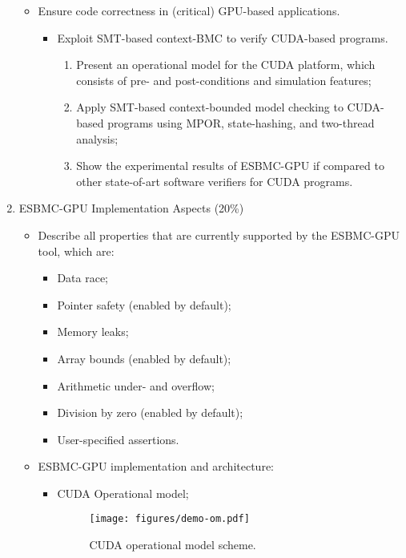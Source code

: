 \documentclass{llncs}
\begin{document}
\begin{enumerate}
\begin{itemize}
     \item Ensure code correctness in (critical) GPU-based applications.
         \begin{itemize}
		\item Exploit SMT-based context-BMC to verify CUDA-based programs.
			\begin{enumerate}
				\item Present an operational model for the CUDA platform, which consists of pre- and post-conditions and simulation features;
				\item Apply SMT-based context-bounded model checking to CUDA-based programs using MPOR, state-hashing, and two-thread analysis;
				\item Show the experimental results of ESBMC-GPU if compared to other state-of-art software verifiers for CUDA programs.\\
			\end{enumerate}
	\end{itemize}
	
  \end{itemize}
 
  \item ESBMC-GPU Implementation Aspects (20\%)\\
  \begin{itemize}
     \item Describe all properties that are currently supported by the ESBMC-GPU tool, which are:
     	\begin{itemize}
		\item Data race;
		\item Pointer safety (enabled by default);
		\item Memory leaks;
		\item Array bounds (enabled by default);
		\item Arithmetic under- and overflow;
		\item Division by zero (enabled by default);
		\item User-specified assertions.\\
	\end{itemize}

     \item ESBMC-GPU implementation and architecture:
      \begin{itemize}
      	\item CUDA Operational model;
	
		\begin{figure}[htb]
  			\centering
  			\texttt{[image: figures/demo-om.pdf]}
  			\caption{CUDA operational model scheme.}
  			\label{figure:demo-om}
		\end{figure}
		

\end{itemize}
\end{itemize}
\end{enumerate}
\end{document}
